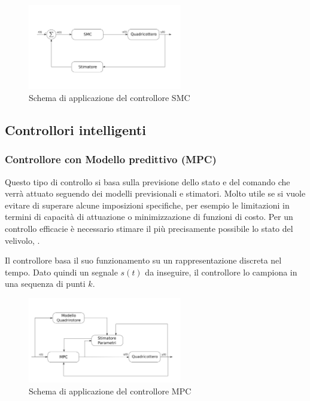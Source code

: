 \begin{figure}
	\centering
	\includegraphics[width=0.6\textwidth]{SistemaQuadrirotore/Figure/SMC}
	\caption{Schema di applicazione del controllore SMC}
\end{figure}

\subsection{Controllori intelligenti}

\subsubsection{Controllore con Modello predittivo (MPC)}

Questo tipo di controllo si basa sulla previsione dello stato e del comando che verrà attuato seguendo dei modelli previsionali e stimatori. Molto utile se si vuole evitare di superare alcune imposizioni specifiche, per esempio le limitazioni in termini di capacità di attuazione o minimizzazione di funzioni di costo.
Per un controllo efficacie è necessario stimare il più precisamente possibile lo stato del velivolo, \cite{KimJinho2020ACSo}.

Il controllore basa il suo funzionamento su un rappresentazione discreta nel tempo. Dato quindi un segnale $s(t)$ da inseguire, il controllore lo campiona in una sequenza di punti $k$.

\begin{figure}
	\centering
	\includegraphics[width=0.6\textwidth]{SistemaQuadrirotore/Figure/MPC}
	\caption{Schema di applicazione del controllore MPC}
\end{figure}

